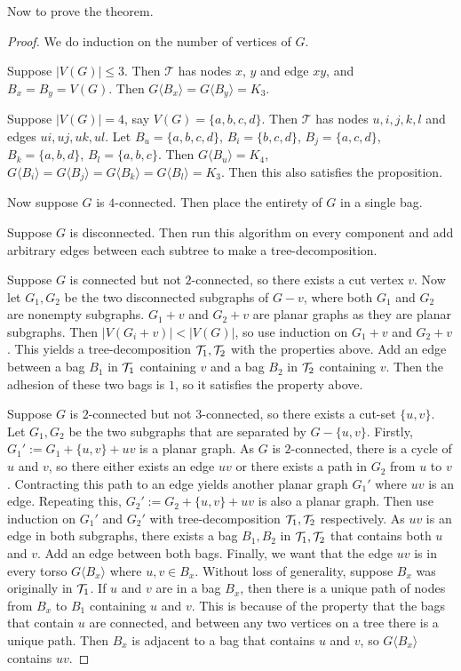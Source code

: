Now to prove the theorem. 
\begin{proof}
	We do induction on the number of vertices of $G$. 
	
	Suppose $|V(G)| \leq 3$. Then $\mathcal{T}$ has nodes $x$, $y$ and edge $xy$, and $B_x = B_y = V(G)$. Then $G \langle B_x \rangle = G \langle B_y \rangle = K_3$. 
	
	Suppose $|V(G)| = 4$, say $V(G) = \{a,b,c,d\}$.  Then $\mathcal{T}$ has nodes $u, i,j,k,l$ and edges $ui, uj, uk, ul$. Let $B_u = \{a,b,c,d\}$, $B_i = \{b,c,d\}$, $B_j = \{a,c,d\}$, $B_k = \{a,b,d\}$, $B_l = \{a,b,c\}$. Then $G\langle B_u \rangle = K_4$, $G\langle B_i \rangle =G\langle B_j\rangle = G\langle B_k \rangle = G\langle B_l \rangle = K_3$. Then this also satisfies the proposition. 

	Now suppose $G$ is $4$-connected. Then place the entirety of $G$ in a single bag.

	Suppose $G$ is disconnected. Then run this algorithm on every component and add arbitrary edges between each subtree to make a tree-decomposition.

	Suppose $G$ is connected but not $2$-connected, so there exists a cut vertex $v$. Now let $G_1, G_2$ be the two disconnected subgraphs of $G - v$, where both $G_1$ and $G_2$ are nonempty subgraphs. $G_1 + v$ and $G_2 + v$ are planar graphs as they are planar subgraphs. Then $|V(G_i + v)| < |V(G)|$, so use induction on $G_1 + v$ and $G_2 + v$. This yields a tree-decomposition $\mathcal{T}_1, \mathcal{T}_2$ with the properties above. Add an edge between a bag $B_1$ in $\mathcal{T}_1$ containing $v$ and a bag $B_2$ in $\mathcal{T}_2$ containing $v$. Then the adhesion of these two bags is $1$, so it satisfies the property above. 

	Suppose $G$ is $2$-connected but not $3$-connected, so there exists a cut-set $\{u,v\}$. Let $G_1, G_2$ be the two subgraphs that are separated by $G - \{u, v\}$. Firstly, $G_1' := G_1 + \{u,v\} + uv$ is a planar graph. As $G$ is $2$-connected, there is a cycle of $u$ and $v$, so there either exists an edge $uv$ or there exists a path in $G_2$ from $u$ to $v$. Contracting this path to an edge yields another planar graph $G_1'$ where $uv$ is an edge. Repeating this, $G_2' := G_2 + \{u,v\} + uv$ is also a planar graph. Then use induction on $G_1'$ and $G_2'$ with tree-decomposition $\mathcal{T}_1, \mathcal{T}_2$ respectively. As $uv$ is an edge in both subgraphs, there exists a bag $B_1, B_2$ in $\mathcal{T}_1, \mathcal{T}_2$ that contains both $u$ and $v$. Add an edge between both bags. Finally, we want that the edge $uv$ is in every torso $G\langle B_x \rangle$ where $u, v \in B_x$. Without loss of generality, suppose $B_x$ was originally in $\mathcal{T}_1$. If $u$ and $v$ are in a bag $B_x$, then there is a unique path of nodes from $B_x$ to $B_1$ containing $u$ and $v$. This is because of the property that the bags that contain $u$ are connected, and between any two vertices on a tree there is a unique path. Then $B_x$ is adjacent to a bag that contains $u$ and $v$, so $G \langle B_x \rangle$ contains $uv$. 


\end{proof}
